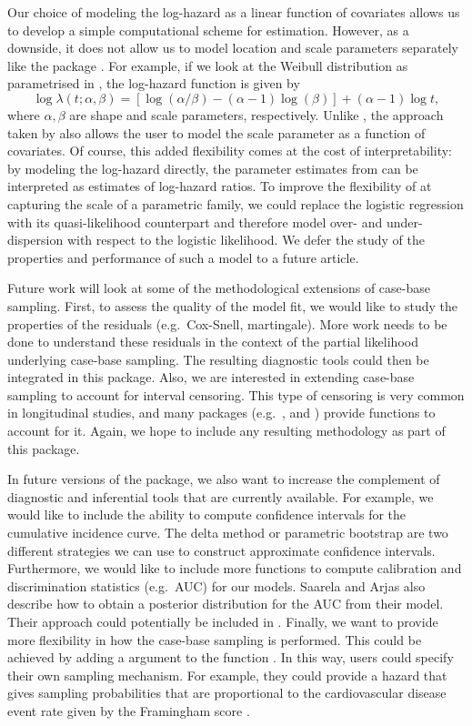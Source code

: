 \documentclass[
]{jss}
\begin{document}
Our choice of modeling the log-hazard as a linear function of covariates
allows us to develop a simple computational scheme for estimation.
However, as a downside, it does not allow us to model location and scale
parameters separately like the package . For example, if
we look at the Weibull distribution as parametrised in
, the log-hazard function is given by
\[ \log \lambda(t; \alpha, \beta) = \left[\log(\alpha/\beta) - (\alpha - 1)\log(\beta)\right] + (\alpha - 1)\log t,\]
where \(\alpha,\beta\) are shape and scale parameters, respectively.
Unlike , the approach taken by  also allows
the user to model the scale parameter as a function of covariates. Of
course, this added flexibility comes at the cost of interpretability: by
modeling the log-hazard directly, the parameter estimates from
 can be interpreted as estimates of log-hazard ratios. To
improve the flexibility of  at capturing the scale of a
parametric family, we could replace the logistic regression with its
quasi-likelihood counterpart and therefore model over- and
under-dispersion with respect to the logistic likelihood. We defer the
study of the properties and performance of such a model to a future
article.

Future work will look at some of the methodological extensions of
case-base sampling. First, to assess the quality of the model fit, we
would like to study the properties of the residuals (e.g.~Cox-Snell,
martingale). More work needs to be done to understand these residuals in
the context of the partial likelihood underlying case-base sampling. The
resulting diagnostic tools could then be integrated in this package.
Also, we are interested in extending case-base sampling to account for
interval censoring. This type of censoring is very common in
longitudinal studies, and many packages (e.g.~,
 and ) provide functions to account for it.
Again, we hope to include any resulting methodology as part of this
package.

In future versions of the package, we also want to increase the
complement of diagnostic and inferential tools that are currently
available. For example, we would like to include the ability to compute
confidence intervals for the cumulative incidence curve. The delta
method or parametric bootstrap are two different strategies we can use
to construct approximate confidence intervals. Furthermore, we would
like to include more functions to compute calibration and discrimination
statistics (e.g.~AUC) for our models. Saarela and Arjas
\citeyearpar{saarela2015non} also describe how to obtain a posterior
distribution for the AUC from their model. Their approach could
potentially be included in . Finally, we want to provide
more flexibility in how the case-base sampling is performed. This could
be achieved by adding a  argument to the function
. In this way, users could specify their own
sampling mechanism. For example, they could provide a hazard that gives
sampling probabilities that are proportional to the cardiovascular
disease event rate given by the Framingham score \citep{saarela2015non}.
\end{document}
